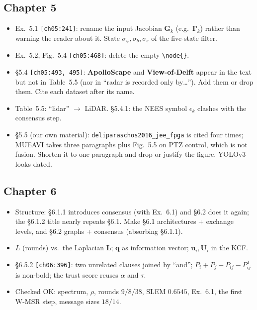 \documentclass[10pt,a4paper]{article}
\newcommand{\src}[1]{{\footnotesize\texttt{[#1]}}}
\newcommand{\key}[1]{\texttt{#1}}
\begin{document}
\subsection*{Chapter 5}
\begin{itemize}
\item Ex.~5.1 \src{ch05:241}: rename the input Jacobian $\mathbf{G}_k$ (e.g.\ $\boldsymbol\Gamma_k$) rather than warning the reader about it. State $\sigma_\psi,\sigma_b,\sigma_s$ of the five-state filter.
\item Ex.~5.2, Fig.~5.4 \src{ch05:468}: delete the empty \verb|\node{}|.
\item \S5.4 \src{ch05:493, 495}: \textbf{ApolloScape} and \textbf{View-of-Delft} appear in the text but not in Table~5.5 (nor in ``radar is recorded only by\ldots''). Add them or drop them. Cite each dataset after its name.
\item Table~5.5: ``lidar'' $\to$ LiDAR. \S5.4.1: the NEES symbol $\epsilon_k$ clashes with the consensus step.
\item \S5.5 (our own material): \key{deliparaschos2016\_jee\_fpga} is cited four times; MUEAVI takes three paragraphs plus Fig.~5.5 on PTZ control, which is not fusion. Shorten it to one paragraph and drop or justify the figure. YOLOv3 looks dated.
\end{itemize}

\subsection*{Chapter 6}
\begin{itemize}
\item Structure: \S6.1.1 introduces consensus (with Ex.~6.1) and \S6.2 does it again; the \S6.1.2 title nearly repeats \S6.1. Make \S6.1 architectures + exchange levels, and \S6.2 graphs + consensus (absorbing \S6.1.1).
\item $L$ (rounds) vs.\ the Laplacian $\mathbf{L}$; $\mathbf{q}$ as information vector; $\mathbf{u}_i,\mathbf{U}_i$ in the KCF.
\item \S6.5.2 \src{ch06:396}: two unrelated clauses joined by ``and''; $P_i+P_j-P_{ij}-P_{ij}^{\mathsf T}$ is non-bold; the trust score reuses $\alpha$ and $\tau$.
\item Checked OK: spectrum, $\rho$, rounds $9/8/38$, SLEM $0.6545$, Ex.~6.1, the first W-MSR step, message sizes $18/14$.
\end{itemize}
\end{document}
